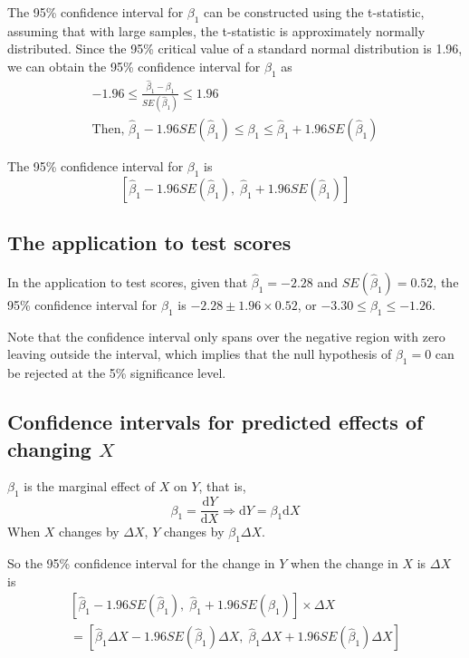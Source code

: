 \documentclass[a4paper,11pt]{article}
\newcommand{\dx}{\mathrm{d}}
\begin{document}
The 95\% confidence interval for \(\beta_1\) can be constructed using the
t-statistic, assuming that with large samples, the t-statistic is
approximately normally distributed. Since the 95\% critical value of a
standard normal distribution is 1.96, we can obtain the 95\% confidence
interval for \(\beta_1\) as
\begin{gather*}
-1.96 \leq \frac{\hat{\beta}_1 - \beta_1}{SE(\hat{\beta}_1)} \leq 1.96 \\
\text{Then, } \hat{\beta}_1 - 1.96 SE(\hat{\beta}_1) \leq \beta_1 \leq \hat{\beta}_1 + 1.96 SE(\hat{\beta}_1)
\end{gather*}

The 95\% confidence interval for \(\beta_1\) is
\[ \left[ \hat{\beta}_1 - 1.96 SE(\hat{\beta}_1),\; \hat{\beta}_1 + 1.96
SE(\hat{\beta}_1) \right] \]


\subsection{The application to test scores}
\label{sec:orgb121764}

In the application to test scores, given that \(\hat{\beta}_1 = -2.28\)
and \(SE(\hat{\beta}_1) = 0.52\), the 95\% confidence interval for
\(\beta_1\) is \({-2.28 \pm 1.96 \times 0.52}\), or \(-3.30 \leq \beta_1
\leq -1.26\).

Note that the confidence interval only spans over the negative
region with zero leaving outside the interval, which implies that the
null hypothesis of \(\beta_1 = 0\) can be rejected at the 5\%
significance level.


\subsection{Confidence intervals for predicted effects of changing \(X\)}
\label{sec:org2a524f9}

\(\beta_1\) is the marginal effect of \(X\) on \(Y\), that is,
\[ \beta_1 = \frac{\dx Y}{ \dx X} \Rightarrow \dx Y = \beta_1 \dx X \]
When \(X\) changes by \(\Delta X\), \(Y\) changes by \(\beta_1 \Delta X\).

So the 95\% confidence interval for the change in \(Y\) when the change
in \(X\) is \(\Delta X\) is
\begin{gather*}
\left[ \hat{\beta}_1 - 1.96 SE(\hat{\beta}_1)  ,\;
\hat{\beta}_1  + 1.96SE(\hat{\beta}_1)   \right] \times \Delta X \\
= \left[ \hat{\beta}_1 \Delta X - 1.96 SE(\hat{\beta}_1) \Delta X,\;
\hat{\beta}_1 \Delta X + 1.96SE(\hat{\beta}_1) \Delta X \right]
\end{gather*}
\end{document}
